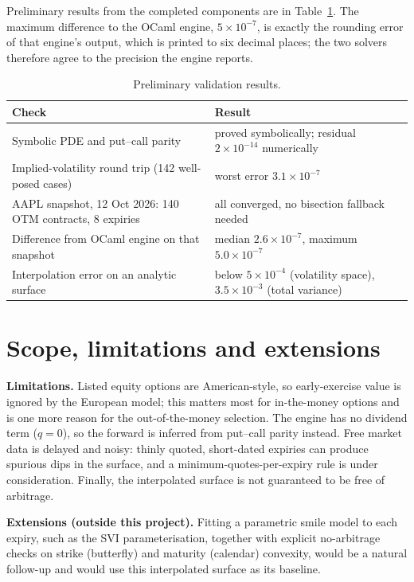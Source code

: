 \documentclass[11pt]{article}
\begin{document}
Preliminary results from the completed components are in Table~\ref{tab:results}. The maximum difference to the OCaml engine, $5\times10^{-7}$, is exactly the rounding error of that engine's output, which is printed to six decimal places; the two solvers therefore agree to the precision the engine reports.

\begin{table}[h]
\centering
\small
\begin{tabular}{@{}p{7.2cm}p{5.6cm}@{}}
\toprule
Check & Result \\
\midrule
Symbolic PDE and put--call parity & proved symbolically; residual $2\times10^{-14}$ numerically \\
Implied-volatility round trip (142 well-posed cases) & worst error $3.1\times10^{-7}$ \\
AAPL snapshot, 12 Oct 2026: 140 OTM contracts, 8 expiries & all converged, no bisection fallback needed \\
Difference from OCaml engine on that snapshot & median $2.6\times10^{-7}$, maximum $5.0\times10^{-7}$ \\
Interpolation error on an analytic surface & below $5\times10^{-4}$ (volatility space), $3.5\times10^{-3}$ (total variance) \\
\bottomrule
\end{tabular}
\caption{Preliminary validation results.}
\label{tab:results}
\end{table}

\section{Scope, limitations and extensions}
\textbf{Limitations.} Listed equity options are American-style, so early-exercise value is ignored by the European model; this matters most for in-the-money options and is one more reason for the out-of-the-money selection. The engine has no dividend term ($q=0$), so the forward is inferred from put--call parity instead. Free market data is delayed and noisy: thinly quoted, short-dated expiries can produce spurious dips in the surface, and a minimum-quotes-per-expiry rule is under consideration. Finally, the interpolated surface is not guaranteed to be free of arbitrage.

\textbf{Extensions (outside this project).} Fitting a parametric smile model to each expiry, such as the SVI parameterisation, together with explicit no-arbitrage checks on strike (butterfly) and maturity (calendar) convexity, would be a natural follow-up and would use this interpolated surface as its baseline.
\end{document}
